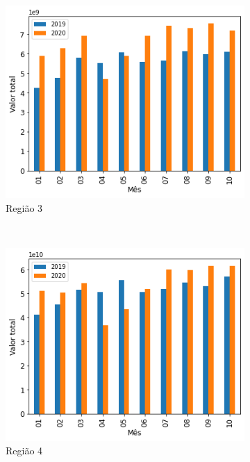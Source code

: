 \begin{figure}[htb]
    \begin{subfigure}[b]{0.45\textwidth}
        \includegraphics[scale=0.45]{images/base-de-dados-13.3-comparacao-valor-total-por-regiao.png}
        \caption{Região 3}
        \label{fig:pandemia:descritiva-13.3-comparacao-valor-total-por-regiao}
    \end{subfigure} ~ \quad
    \begin{subfigure}[b]{0.45\textwidth}
        \includegraphics[scale=0.45]{images/base-de-dados-13.4-comparacao-valor-total-por-regiao.png}
        \caption{Região 4}
        \label{fig:pandemia:descritiva-13.4-comparacao-valor-total-por-regiao}
    \end{subfigure} ~ \\
    \begin{subfigure}[b]{0.45\textwidth} 

\end{subfigure}
\end{figure}
